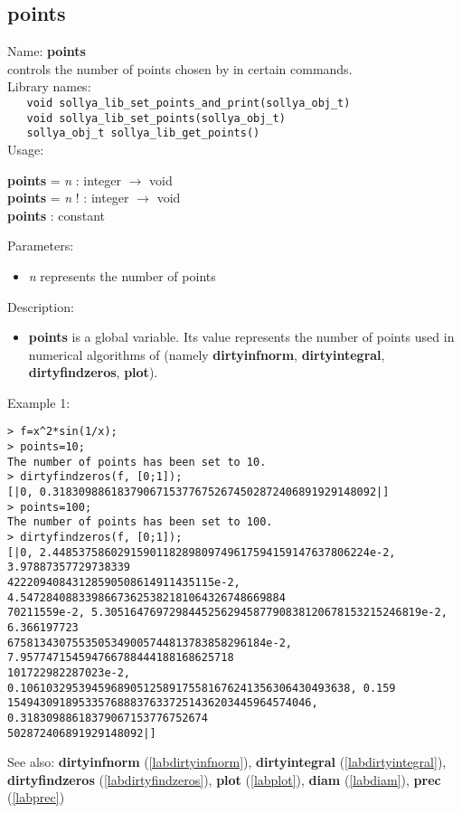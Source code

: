\subsection{points}
\label{labpoints}
\noindent Name: \textbf{points}\\
\phantom{aaa}controls the number of points chosen by \sollya in certain commands.\\[0.2cm]
\noindent Library names:\\
\verb|   void sollya_lib_set_points_and_print(sollya_obj_t)|\\
\verb|   void sollya_lib_set_points(sollya_obj_t)|\\
\verb|   sollya_obj_t sollya_lib_get_points()|\\[0.2cm]
\noindent Usage: 
\begin{center}
\textbf{points} = \emph{n} : \textsf{integer} $\rightarrow$ \textsf{void}\\
\textbf{points} = \emph{n} ! : \textsf{integer} $\rightarrow$ \textsf{void}\\
\textbf{points} : \textsf{constant}\\
\end{center}
Parameters: 
\begin{itemize}
\item \emph{n} represents the number of points
\end{itemize}
\noindent Description: \begin{itemize}

\item \textbf{points} is a global variable. Its value represents the number of points
   used in numerical algorithms of \sollya (namely \textbf{dirtyinfnorm},
   \textbf{dirtyintegral}, \textbf{dirtyfindzeros}, \textbf{plot}).
\end{itemize}
\noindent Example 1: 
\begin{center}\begin{minipage}{15cm}\begin{Verbatim}[frame=single,commandchars=\\\|\~]
> f=x^2*sin(1/x);
> points=10;
The number of points has been set to 10.
> dirtyfindzeros(f, [0;1]);
[|0, 0.31830988618379067153776752674502872406891929148092|]
> points=100;
The number of points has been set to 100.
> dirtyfindzeros(f, [0;1]);
[|0, 2.4485375860291590118289809749617594159147637806224e-2, 3.97887357729738339
42220940843128590508614911435115e-2, 4.54728408833986673625382181064326748669884
70211559e-2, 5.3051647697298445256294587790838120678153215246819e-2, 6.366197723
6758134307553505349005744813783858296184e-2, 7.957747154594766788444188168625718
101722982287023e-2, 0.106103295394596890512589175581676241356306430493638, 0.159
15494309189533576888376337251436203445964574046, 0.31830988618379067153776752674
502872406891929148092|]
\end{Verbatim}
\end{minipage}\end{center}
See also: \textbf{dirtyinfnorm} (\ref{labdirtyinfnorm}), \textbf{dirtyintegral} (\ref{labdirtyintegral}), \textbf{dirtyfindzeros} (\ref{labdirtyfindzeros}), \textbf{plot} (\ref{labplot}), \textbf{diam} (\ref{labdiam}), \textbf{prec} (\ref{labprec})
